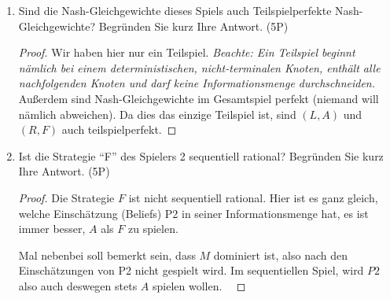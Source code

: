 \documentclass[12pt]{article}
\begin{document}
\begin{enumerate}[label=\alph*\upshape)]
\begin{proof}
			\textit{Hier bin ich mir nicht sicher, ob man nur in reinen Strategien untersuchen sollte.} Tipp: die Suche nach Nash-Gleichgewichten in gemischten Strategien für drei Strategien ist schwierig und dauert lang. Oft Mals kann man allerdings eine der drei Strategien vorab ausschließen. ~\smallskip
			
			Da $M$ strikt dominiert ist durch $R$, folgt analog wie in Aufgabe 1, dass $M$ in keinem Gleichgewicht vorkommen kann. Angenommmen P1 spielt mit Wahrscheinlichkeit $p \in (0, 1)$ die Strategie $L$ und mit $(1-p)$ die Strategie $R$. Für ein Nash-Gleichgewicht müsste der erwartete Nutzen für P2 ausgeglichen sein, d.h.
			\begin{align*}
				\mathbb{E}[u(A)] & \overset{!}{=} \mathbb{E}[u(F)] \\
				\iff 1 \cdot p +  3 \cdot (1-p) & = 0 \cdot p + 3 \cdot (1-p) \iff p = 0,
			\end{align*}
			was einen Widerspruch darstellt. Es existiert also kein Nash-Gleichgewicht in (echt) gemischten Strategien und $(L,A)$ und $(R, F)$ sind damit die einzigen Gleichgewichte. ~\smallskip
			
			\textit{Auch hier gibt es wieder ein kurzes Argument: $A$ dominiert nämlich die Strategie $F$ schwach. Würde P1 eine echte Mischung auf $L$ und $R$ spielen, wird P2 stets $A$ wählen wollen, worauf $P1$ allerdings lieber rein $L$ spielt. Das heißt es kann kein Gleichgewicht in gemischten Strategien geben. Falls dies nicht ganz klar ist, einfach wie oben kurz per Hand nachrechnen.}
		\end{proof}
	\item Sind die Nash-Gleichgewichte dieses Spiels auch Teilspielperfekte Nash-Gleichgewichte? Begründen Sie kurz Ihre Antwort. (5P)
		\begin{proof}
			Wir haben hier nur ein Teilspiel. \textit{Beachte: Ein Teilspiel beginnt nämlich bei einem deterministischen, nicht-terminalen Knoten, enthält alle nachfolgenden Knoten und darf keine Informationsmenge durchschneiden.} Außerdem sind Nash-Gleichgewichte im Gesamtspiel perfekt (niemand will nämlich abweichen). Da dies das einzige Teilspiel ist, sind $(L,A)$ und $(R, F)$ auch teilspielperfekt. 
		\end{proof}
	\item Ist die Strategie \enquote{F} des Spielers 2 sequentiell rational? Begründen Sie kurz Ihre Antwort. (5P)
		\begin{proof}
			Die Strategie $F$ ist nicht sequentiell rational. Hier ist es ganz gleich, welche Einschätzung (Beliefs) P2 in seiner Informationsmenge hat, es ist immer besser, $A$ als $F$ zu spielen. ~\smallskip
			
			Mal nebenbei soll bemerkt sein, dass $M$ dominiert ist, also nach den Einschätzungen von P2 nicht gespielt wird. Im sequentiellen Spiel, wird $P2$ also auch deswegen stets $A$ spielen wollen. ~\smallskip
		\end{proof}
\end{enumerate}
\end{document}
